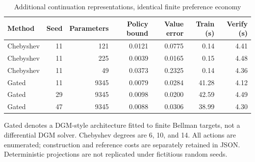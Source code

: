 \begin{table}[htbp]\centering
\caption{Additional continuation representations, identical finite preference economy}
\begin{small}\begin{tabular}{lrrrrrr}
\toprule
Method & Seed & Parameters & Policy bound & Value error & Train (s) & Verify (s) \\
\midrule
Chebyshev & 11 & 121 & 0.0121 & 0.0775 & 0.14 & 4.41 \\
Chebyshev & 11 & 225 & 0.0039 & 0.0165 & 0.15 & 4.48 \\
Chebyshev & 11 & 49 & 0.0373 & 0.2325 & 0.14 & 4.36 \\
Gated & 11 & 9345 & 0.0079 & 0.0284 & 41.28 & 4.12 \\
Gated & 29 & 9345 & 0.0098 & 0.0200 & 42.59 & 4.49 \\
Gated & 47 & 9345 & 0.0088 & 0.0306 & 38.99 & 4.30 \\
\bottomrule\end{tabular}\end{small}
\par\smallskip\begin{minipage}{.96\linewidth}\footnotesize Gated denotes a DGM-style architecture fitted to finite Bellman targets, not a differential DGM solver. Chebyshev degrees are 6, 10, and 14. All actions are enumerated; construction and reference costs are separately retained in JSON. Deterministic projections are not replicated under fictitious random seeds.\end{minipage}
\end{table}
